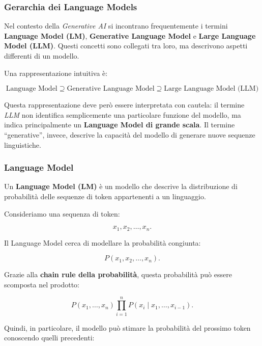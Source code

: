 \subsubsection{Gerarchia dei Language Models}

Nel contesto della \textit{Generative AI} si incontrano frequentemente i termini \textbf{Language Model (LM)}, \textbf{Generative Language Model} e \textbf{Large Language Model (LLM)}. Questi concetti sono collegati tra loro, ma descrivono aspetti differenti di un modello.

Una rappresentazione intuitiva è:

\begin{equation}
\text{Language Model}
\supseteq
\text{Generative Language Model}
\supseteq
\text{Large Language Model (LLM)}
\end{equation}

Questa rappresentazione deve però essere interpretata con cautela: il termine \textit{LLM} non identifica semplicemente una particolare funzione del modello, ma indica principalmente un \textbf{Language Model di grande scala}. Il termine ``generative'', invece, descrive la capacità del modello di generare nuove sequenze linguistiche.

\subsubsection{Language Model}

Un \textbf{Language Model (LM)} è un modello che descrive la distribuzione di probabilità delle sequenze di token appartenenti a un linguaggio.

Consideriamo una sequenza di token:

\begin{equation}
x_1,x_2,\ldots,x_n.
\end{equation}

Il Language Model cerca di modellare la probabilità congiunta:

\begin{equation}
P(x_1,x_2,\ldots,x_n).
\end{equation}

Grazie alla \textbf{chain rule della probabilità}, questa probabilità può essere scomposta nel prodotto:

\begin{equation}
P(x_1,\ldots,x_n)
\prod_{i=1}^{n}
P(x_i\mid x_1,\ldots,x_{i-1}).
\end{equation}

Quindi, in particolare, il modello può stimare la probabilità del prossimo token conoscendo quelli precedenti:

